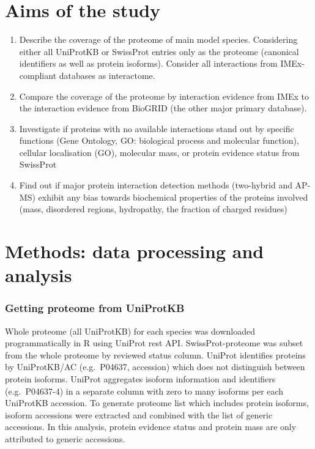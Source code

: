 \documentclass[12pt,]{report}
\begin{document}
\chapter{Aims of the study}\label{aims-of-the-study}

\begin{enumerate}
\def\labelenumi{\arabic{enumi}.}
\item
  Describe the coverage of the proteome of main model species.
  Considering either all UniProtKB or SwissProt entries only as the
  proteome (canonical identifiers as well as protein isoforms). Consider
  all interactions from IMEx-compliant databases as interactome.
\item
  Compare the coverage of the proteome by interaction evidence from IMEx
  to the interaction evidence from BioGRID (the other major primary
  database).
\item
  Investigate if proteins with no available interactions stand out by
  specific functions (Gene Ontology, GO: biological process and
  molecular function), cellular localisation (GO), molecular mass, or
  protein evidence status from SwissProt
\item
  Find out if major protein interaction detection methods (two-hybrid
  and AP-MS) exhibit any bias towards biochemical properties of the
  proteins involved (mass, disordered regions, hydropathy, the fraction
  of charged residues)
\end{enumerate}

\chapter{Methods: data processing and
analysis}\label{methods-data-processing-and-analysis}

\subsection{Getting proteome from
UniProtKB}\label{getting-proteome-from-uniprotkb}

Whole proteome (all UniProtKB) for each species was downloaded
programmatically in R using UniProt rest API. SwissProt-proteome was
subset from the whole proteome by reviewed status column. UniProt
identifies proteins by UniProtKB/AC (e.g.~P04637, accession) which does
not distinguish between protein isoforms. UniProt aggregates isoform
information and identifiers (e.g.~P04637-4) in a separate column with
zero to many isoforms per each UniProtKB accession. To generate proteome
list which includes protein isoforms, isoform accessions were extracted
and combined with the list of generic accessions. In this analysis,
protein evidence status and protein mass are only attributed to generic
accessions.
\end{document}
